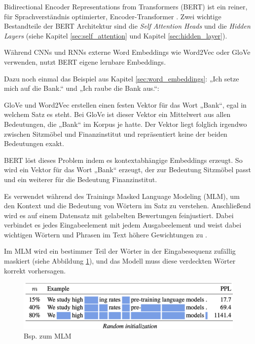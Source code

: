 Bidirectional Encoder Representations from Transformers (BERT) ist ein reiner, für Sprachverständnis optimierter, Encoder-Transformer \cite{devlin2019}.
Zwei wichtige Bestandteile der BERT Architektur sind die \textit{Self Attention Heads} und die \textit{Hidden Layers}
(siehe Kapitel \ref{sec:self_attention} und Kapitel \ref{sec:hidden_layer}).

Während CNNs und RNNs externe Word Embeddings wie Word2Vec oder GloVe verwenden, nutzt BERT eigene lernbare Embeddings.

Dazu noch einmal das Beispiel aus Kapitel \ref{sec:word_embeddings}: „Ich setze mich auf die Bank.“ und „Ich raube die Bank aus.“:

GloVe und Word2Vec erstellen einen festen Vektor für das Wort „Bank“, egal in welchem Satz es steht.
Bei GloVe ist dieser Vektor ein Mittelwert aus allen Bedeutungen, die „Bank“ im Korpus je hatte.
Der Vektor liegt folglich irgendwo zwischen Sitzmöbel und Finanzinstitut und repräsentiert keine der beiden Bedeutungen exakt.

BERT löst dieses Problem indem es kontextabhängige Embeddings erzeugt. So wird ein Vektor für das Wort „Bank“ erzeugt, der zur Bedeutung
Sitzmöbel passt und ein weiterer für die Bedeutung Finanzinstitut.

Es verwendet während des Trainings Masked Language Modeling (MLM), um den Kontext und die Bedeutung von Wörtern im Satz zu verstehen.
Anschließend wird es auf einem Datensatz mit gelabelten Bewertungen feinjustiert. 
Dabei verbindet es jedes Eingabeelement mit jedem Ausgabeelement und 
weist dabei wichtigen Wörtern und Phrasen im Text höhere Gewichtungen zu \cite{Deshai:2023aa}.

Im MLM wird ein bestimmer Teil der Wörter in der Eingabesequenz zufällig maskiert (siehe Abbildung \ref{fig:mlm_bert}), 
und das Modell muss diese verdeckten Wörter korrekt vorhersagen.

\begin{figure}[htbp]
    \begin{center}
        \includegraphics[scale=0.5]{static/mlm_bert.png}
        \caption{\label{fig:mlm_bert} Bsp. zum MLM \cite{wettig2023}}
    \end{center}
\end{figure}

